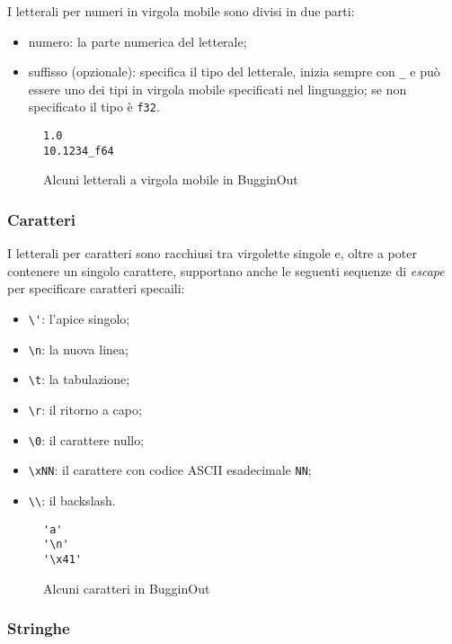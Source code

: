 	I letterali per numeri in virgola mobile sono divisi in due parti:
\begin{itemize}
	\item numero: la parte numerica del letterale;
	\item suffisso (opzionale): specifica il tipo del letterale, inizia sempre con \texttt{\_} e pu\`o essere uno dei tipi in virgola mobile specificati nel linguaggio; se non specificato il tipo \`e \texttt{f32}.
\end{itemize}
\begin{figure}[H]
	\centering
	\begin{verbatim}
1.0
10.1234_f64
	\end{verbatim}
	\caption{Alcuni letterali a virgola mobile in BugginOut}
	\label{fig:float-literals-example}
\end{figure}

\subsubsection{Caratteri}

I letterali per caratteri sono racchiusi tra virgolette singole e, oltre a poter contenere un singolo carattere, supportano anche le seguenti sequenze di \textit{escape} per specificare caratteri specaili:
\begin{itemize}
	\item \verb|\'|: l'apice singolo;
	\item \verb|\n|: la nuova linea;
	\item \verb|\t|: la tabulazione;
	\item \verb|\r|: il ritorno a capo;
	\item \verb|\0|: il carattere nullo;
	\item \verb|\xNN|: il carattere con codice ASCII esadecimale \texttt{NN};
	\item \verb|\\|: il backslash.
\end{itemize}

\begin{figure}[H]
	\centering
	\begin{verbatim}
'a'
'\n'
'\x41'
	\end{verbatim}
	\caption{Alcuni caratteri in BugginOut}
	\label{fig:char-literals-example}
\end{figure}

\subsubsection{Stringhe}

